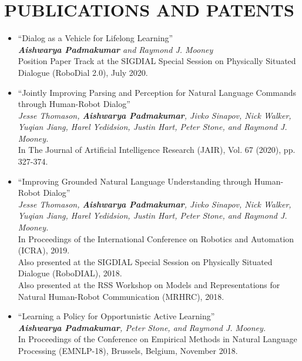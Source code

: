 \documentclass[letterpaper,10pt]{resume}
\begin{document}
{\section{PUBLICATIONS AND PATENTS}
\begin{itemize}
\item ``Dialog as a Vehicle for Lifelong Learning'' \\
\textit{\textbf{Aishwarya Padmakumar} and Raymond J. Mooney} \\
Position Paper Track at the SIGDIAL Special Session on Physically Situated Dialogue (RoboDial 2.0), July 2020.
\vspace{0.2cm}

\item  ``Jointly Improving Parsing and Perception for Natural Language Commands through Human-Robot Dialog'' \\
\textit{Jesse Thomason, \textbf{Aishwarya Padmakumar}, Jivko Sinapov, Nick Walker, Yuqian Jiang, Harel Yedidsion, Justin Hart, Peter Stone, and Raymond J. Mooney.} \\
In The Journal of Artificial Intelligence Research (JAIR), Vol. 67 (2020), pp. 327-374.
\vspace{0.2cm}

\item  ``Improving Grounded Natural Language Understanding through Human-Robot Dialog'' \\
\textit{Jesse Thomason, \textbf{Aishwarya Padmakumar}, Jivko Sinapov, Nick Walker, Yuqian Jiang, Harel Yedidsion, Justin Hart, Peter Stone, and Raymond J. Mooney.} \\
In Proceedings of the International Conference on Robotics and Automation (ICRA), 2019. \\
Also presented at the SIGDIAL Special Session on Physically Situated Dialogue (RoboDIAL), 2018. \\
Also presented at the RSS Workshop on Models and Representations for Natural Human-Robot Communication (MRHRC), 2018. 
\vspace{0.2cm}

\item  ``Learning a Policy for Opportunistic Active Learning'' \\
\textit{\textbf{Aishwarya Padmakumar}, Peter Stone, and Raymond J. Mooney. } \\
In Proceedings of the Conference on Empirical Methods in Natural Language Processing (EMNLP-18), Brussels, Belgium, November 2018. 
\vspace{0.2cm}


\end{itemize}}
\end{document}
